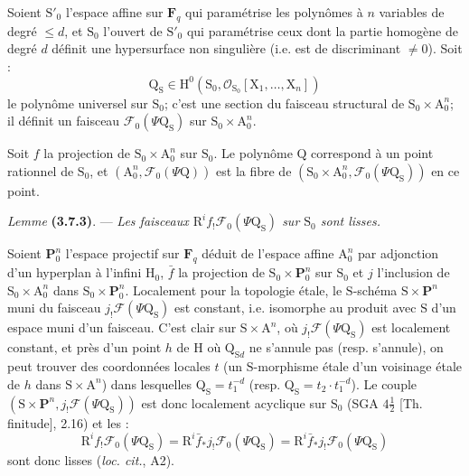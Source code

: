 \documentclass[11pt,leqno]{article}
\begin{document}
Soient \(\mathrm S'_0\) l’espace affine sur \(\mathbf F_q\) qui paramétrise les polynômes à \(n\) variables de degré \(\leq d\), et \(\mathrm S_0\) l’ouvert de \(\mathrm S'_0\) qui paramétrise ceux dont la partie homogène de degré \(d\) définit une hypersurface non singulière (i.e. est de discriminant \(\ne0\)). Soit :
\[
\mathrm Q_{\mathrm S}\in
\mathrm H^0(\mathrm S_0,\mathscr O_{\mathrm S_0}[\mathrm X_1,\ldots,\mathrm X_n])
\]
le polynôme universel sur \(\mathrm S_0\); c’est une section du faisceau structural de \(\mathrm S_0\times\mathrm A_0^n\); il définit un faisceau \(\mathscr F_0(\Psi\mathrm Q_{\mathrm S})\) sur \(\mathrm S_0\times\mathrm A_0^n\).

Soit \(f\) la projection de \(\mathrm S_0\times\mathrm A_0^n\) sur \(\mathrm S_0\). Le polynôme \(\mathrm Q\) correspond à un point rationnel de \(\mathrm S_0\), et \((\mathrm A_0^n,\mathscr F_0(\Psi\mathrm Q))\) est la fibre de \((\mathrm S_0\times\mathrm A_0^n,\mathscr F_0(\Psi\mathrm Q_{\mathrm S}))\) en ce point.

\textit{Lemme} \textbf{(3.7.3)}. — \textit{Les faisceaux \(\mathrm R^if_!\mathscr F_0(\Psi\mathrm Q_{\mathrm S})\) sur \(\mathrm S_0\) sont lisses.}

Soient \(\mathbf P_0^n\) l’espace projectif sur \(\mathbf F_q\) déduit de l’espace affine \(\mathrm A_0^n\) par adjonction d’un hyperplan à l’infini \(\mathrm H_0\), \(\bar f\) la projection de \(\mathrm S_0\times\mathbf P_0^n\) sur \(\mathrm S_0\) et \(j\) l’inclusion de \(\mathrm S_0\times\mathrm A_0^n\) dans \(\mathrm S_0\times\mathbf P_0^n\). Localement pour la topologie étale, le \(\mathrm S\)-schéma \(\mathrm S\times\mathbf P^n\) muni du faisceau \(j_!\mathscr F(\Psi\mathrm Q_{\mathrm S})\) est constant, i.e. isomorphe au produit avec \(\mathrm S\) d’un espace muni d’un faisceau. C’est clair sur \(\mathrm S\times\mathrm A^n\), où \(j_!\mathscr F(\Psi\mathrm Q_{\mathrm S})\) est localement constant, et près d’un point \(h\) de \(\mathrm H\) où \(\mathrm Q_{\mathrm S d}\) ne s’annule pas (resp. s’annule), on peut trouver des coordonnées locales \(t\) (un \(\mathrm S\)-morphisme étale d’un voisinage étale de \(h\) dans \(\mathrm S\times\mathrm A^n\)) dans lesquelles \(\mathrm Q_{\mathrm S}=t_1^{-d}\) (resp. \(\mathrm Q_{\mathrm S}=t_2\cdot t_1^{-d}\)). Le couple \((\mathrm S\times\mathbf P^n,j_!\mathscr F(\Psi\mathrm Q_{\mathrm S}))\) est donc localement acyclique sur \(\mathrm S_0\) (SGA \(4\frac{1}{2}\) [Th. finitude], 2.16) et les :
\[
\mathrm R^if_!\mathscr F_0(\Psi\mathrm Q_{\mathrm S})
=
\mathrm R^i\bar f_*j_!\mathscr F_0(\Psi\mathrm Q_{\mathrm S})
=
\mathrm R^i\bar f_*j_!\mathscr F_0(\Psi\mathrm Q_{\mathrm S})
\]
sont donc lisses (\textit{loc. cit.}, A2).
\end{document}
